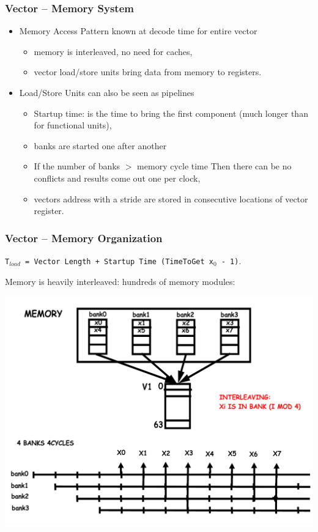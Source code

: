 \documentclass{beamer}
\begin{document}
\begin{frame}[fragile,t]
\frametitle{Vector -- Memory System}

\begin{itemize}
    \item Memory Access Pattern known at decode time for entire vector\smallskip
    \begin{itemize}
        \item memory is interleaved, no need for caches,\smallskip
        \item vector load/store units bring data from memory to registers.
    \end  {itemize}\medskip

    \item Load/Store Units can also be seen as pipelines\smallskip
    \begin{itemize}
        \item Startup time: is the time to bring the first component
                (much longer than for functional units),\smallskip
        \item banks are started one after another\smallskip
        \item If the number of banks $>$ memory cycle time Then 
                there can be no conflicts and results come 
                out one per clock,\smallskip
        \item vectors address with a stride are stored in consecutive
                locations of vector register. 
    \end  {itemize}

\end  {itemize}
\end{frame}


\begin{frame}[fragile,t]
\frametitle{Vector -- Memory Organization}

{\tt T$_{load}$ = Vector Length + Startup Time (TimeToGet x$_0$ - 1)}.\medskip

Memory is heavily interleaved: hundreds of memory modules:

\includegraphics[width=53ex]{Figures/VectorMemBanksPipe}

\end{frame}
\end{document}

